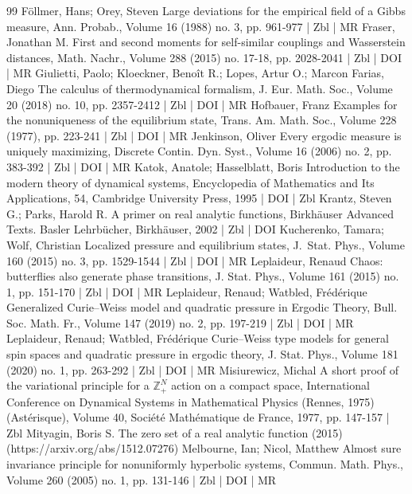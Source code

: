 \documentclass[10pt]{amsart}
\theoremstyle{definition}\newtheorem{defi}[theo]{Definition}\newtheorem{rema}[theo]{Remark}\newtheorem{exam}[theo]{Example}\newtheorem{exem}[theo]{Example}\newtheorem{nota}[theo]{Notation}
\theoremstyle{plain}
\theoremstyle{plain}
\newcounter{In}
\newcommand*\8{\infty}
\begin{document}
\begin{thebibliography}{99}
Föllmer, Hans; Orey, Steven Large deviations for the empirical field of a Gibbs measure, Ann. Probab., Volume 16 (1988) no. 3, pp. 961-977 | Zbl | MR
Fraser, Jonathan M. First and second moments for self-similar couplings and Wasserstein distances, Math. Nachr., Volume 288 (2015) no. 17-18, pp. 2028-2041 | Zbl | DOI | MR
Giulietti, Paolo; Kloeckner, Benoît R.; Lopes, Artur O.; Marcon Farias, Diego The calculus of thermodynamical formalism, J. Eur. Math. Soc., Volume 20 (2018) no. 10, pp. 2357-2412 | Zbl | DOI | MR
Hofbauer, Franz Examples for the nonuniqueness of the equilibrium state, Trans. Am. Math. Soc., Volume 228 (1977), pp. 223-241 | Zbl | DOI | MR
Jenkinson, Oliver Every ergodic measure is uniquely maximizing, Discrete Contin. Dyn. Syst., Volume 16 (2006) no. 2, pp. 383-392 | Zbl | DOI | MR
Katok, Anatole; Hasselblatt, Boris Introduction to the modern theory of dynamical systems, Encyclopedia of Mathematics and Its Applications, 54, Cambridge University Press, 1995 | DOI | Zbl
Krantz, Steven G.; Parks, Harold R. A primer on real analytic functions, Birkhäuser Advanced Texts. Basler Lehrbücher, Birkhäuser, 2002 | Zbl | DOI
Kucherenko, Tamara; Wolf, Christian Localized pressure and equilibrium states, J. Stat. Phys., Volume 160 (2015) no. 3, pp. 1529-1544 | Zbl | DOI | MR
Leplaideur, Renaud Chaos: butterflies also generate phase transitions, J. Stat. Phys., Volume 161 (2015) no. 1, pp. 151-170 | Zbl | DOI | MR
Leplaideur, Renaud; Watbled, Frédérique Generalized Curie–Weiss model and quadratic pressure in Ergodic Theory, Bull. Soc. Math. Fr., Volume 147 (2019) no. 2, pp. 197-219 | Zbl | DOI | MR
Leplaideur, Renaud; Watbled, Frédérique Curie–Weiss type models for general spin spaces and quadratic pressure in ergodic theory, J. Stat. Phys., Volume 181 (2020) no. 1, pp. 263-292 | Zbl | DOI | MR
Misiurewicz, Michal A short proof of the variational principle for a $\mathbb{Z}^N_+$ action on a compact space, International Conference on Dynamical Systems in Mathematical Physics (Rennes, 1975) (Astérisque), Volume 40, Société Mathématique de France, 1977, pp. 147-157 | Zbl
Mityagin, Boris S. The zero set of a real analytic function (2015) (https://arxiv.org/abs/1512.07276)
Melbourne, Ian; Nicol, Matthew Almost sure invariance principle for nonuniformly hyperbolic systems, Commun. Math. Phys., Volume 260 (2005) no. 1, pp. 131-146 | Zbl | DOI | MR

\end{thebibliography}
\end{document}
